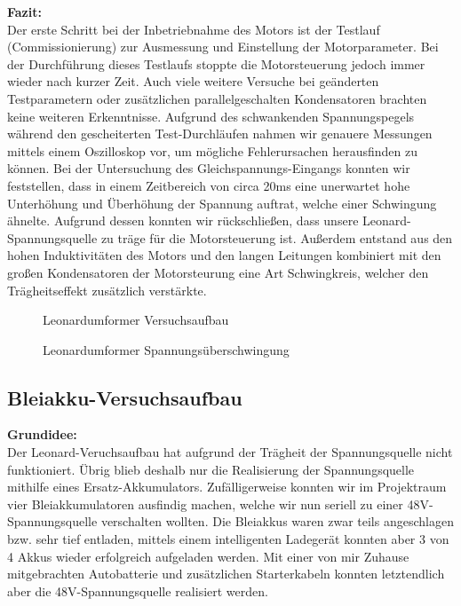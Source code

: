 \textbf{Fazit:}
\\[2mm]
Der erste Schritt bei der Inbetriebnahme des Motors ist der Testlauf (Commissionierung) zur Ausmessung und Einstellung der Motorparameter. Bei der Durchführung dieses Testlaufs stoppte die Motorsteuerung jedoch immer wieder nach kurzer Zeit. Auch viele weitere Versuche bei geänderten Testparametern oder zusätzlichen parallelgeschalten Kondensatoren brachten keine weiteren Erkenntnisse. Aufgrund des schwankenden Spannungspegels während den gescheiterten Test-Durchläufen nahmen wir genauere Messungen mittels einem Oszilloskop vor, um mögliche Fehlerursachen herausfinden zu können. Bei der Untersuchung des Gleichspannungs-Eingangs konnten wir feststellen, dass in einem Zeitbereich von circa 20ms eine unerwartet hohe Unterhöhung und Überhöhung der Spannung auftrat, welche einer Schwingung ähnelte. Aufgrund dessen konnten wir rückschließen, dass unsere Leonard-Spannungsquelle zu träge für die Motorsteuerung ist. Außerdem entstand aus den hohen Induktivitäten des Motors und den langen Leitungen kombiniert mit den großen Kondensatoren der Motorsteurung eine Art Schwingkreis, welcher den Trägheitseffekt zusätzlich verstärkte.

\begin{figure}[H]
	\begin{center}
		\caption{Leonardumformer Versuchsaufbau}
	\end{center}
\end{figure}

\begin{figure}[H]
	\begin{center}
		\caption{Leonardumformer Spannungsüberschwingung}
	\end{center}
\end{figure}

\newpage

\subsection{Bleiakku-Versuchsaufbau}

\textbf{Grundidee:}
\\[2mm]
Der Leonard-Veruchsaufbau hat aufgrund der Trägheit der Spannungsquelle nicht funktioniert. Übrig blieb deshalb nur die Realisierung der Spannungsquelle mithilfe eines Ersatz-Akkumulators. Zufälligerweise konnten wir im Projektraum vier Bleiakkumulatoren ausfindig machen, welche wir nun seriell zu einer 48V-Spannungsquelle verschalten wollten. Die Bleiakkus waren zwar teils angeschlagen bzw. sehr tief entladen, mittels einem intelligenten Ladegerät konnten aber 3 von 4 Akkus wieder erfolgreich aufgeladen werden. Mit einer von mir Zuhause mitgebrachten Autobatterie und zusätzlichen Starterkabeln konnten letztendlich aber die 48V-Spannungsquelle realisiert werden.
\\[5mm]

